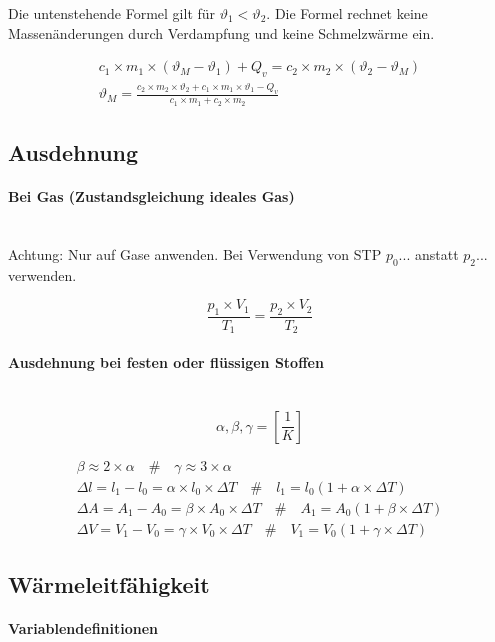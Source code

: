 \documentclass[a4paper,10pt]{article}
\newcommand{\lbparagraph}[1]{\paragraph{#1}\mbox{}\\}
\newcommand{\eqsp}[1]{\quad\#\quad}
\begin{document}
Die untenstehende Formel gilt für ${\vartheta}_1 < {\vartheta}_2$. Die Formel rechnet keine Massenänderungen durch Verdampfung und keine Schmelzwärme ein.

\begin{gather}
    c_1 \times m_1 \times ({\vartheta}_M - {\vartheta}_1) + Q_v = c_2 \times m_2 \times ({\vartheta}_2 - {\vartheta}_M) \\
    {\vartheta}_M = \frac{c_2 \times m_2 \times {\vartheta}_2 + c_1 \times m_1 \times {\vartheta}_1 - Q_v}{c_1 \times m_1 + c_2 \times m_2}
\end{gather}

\subsection{Ausdehnung}

\lbparagraph{Bei Gas (Zustandsgleichung ideales Gas)}

Achtung: Nur auf Gase anwenden. Bei Verwendung von STP $p_0...$ anstatt $p_2...$ verwenden.

\begin{equation}
    \frac{p_1 \times V_1}{T_1} = \frac{p_2 \times V_2}{T_2}
\end{equation}

\lbparagraph{Ausdehnung bei festen oder flüssigen Stoffen}

\begin{equation*}
    \alpha, \beta, \gamma = [\frac{1}{K}]
\end{equation*}

\begin{gather}
    \beta \approx 2 \times \alpha
    \eqsp{}
    \gamma \approx 3 \times \alpha \\
    {\Delta}l = l_1 - l_0 = \alpha \times l_0 \times {\Delta}T
    \eqsp{}
    l_1 = l_0(1 + \alpha \times {\Delta}T) \\
    {\Delta}A = A_1 - A_0 = \beta \times A_0 \times {\Delta}T
    \eqsp{}
    A_1 = A_0(1 + \beta \times {\Delta}T) \\
    {\Delta}V = V_1 - V_0 = \gamma \times V_0 \times {\Delta}T
    \eqsp{}
    V_1 = V_0(1 + \gamma \times {\Delta}T)
\end{gather}

\subsection{Wärmeleitfähigkeit}

\lbparagraph{Variablendefinitionen}
\end{document}
